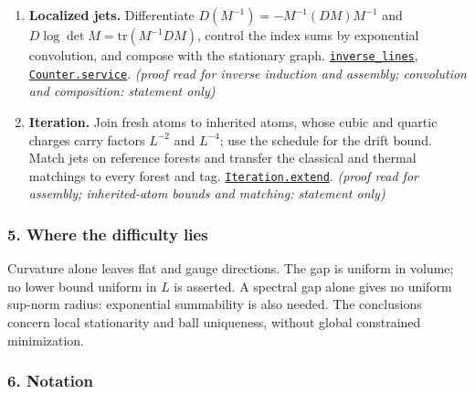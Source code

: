 \documentclass[
  letterpaper,
  11pt]{article}
\begin{document}
\begin{enumerate}
  \emph{(proof read; direct shell/action-derivative estimates: statement
  only)}
\item
  \textbf{Localized jets.} Differentiate \(D(M^{-1})=-M^{-1}(DM)M^{-1}\)
  and \(D\log\det M=\mathrm{tr}(M^{-1}DM)\), control the index sums by
  exponential convolution, and compose with the stationary graph.
  \href{https://github.com/yang-mills-group/OpenAI-YM-20261028/blob/3456e5e75cf8d4cd558955a5c7638fba2d68f464/YM/Planned/STATIONARY_JET_PORT/Lines.lean\#L56-L108}{\texttt{inverse\_lines}},
  \href{https://github.com/yang-mills-group/OpenAI-YM-20261028/blob/3456e5e75cf8d4cd558955a5c7638fba2d68f464/YM/Planned/STATIONARY_JET_PORT/InUse.lean\#L116-L145}{\texttt{Counter.service}}.
  \emph{(proof read for inverse induction and assembly; convolution and
  composition: statement only)}
\item
  \textbf{Iteration.} Join fresh atoms to inherited atoms, whose cubic
  and quartic charges carry factors \(L^{-2}\) and \(L^{-4}\); use the
  schedule for the drift bound. Match jets on reference forests and
  transfer the classical and thermal matchings to every forest and tag.
  \href{https://github.com/yang-mills-group/OpenAI-YM-20261028/blob/3456e5e75cf8d4cd558955a5c7638fba2d68f464/YM/Extra/ITERATION_NO_LOSS/Mechanism.lean\#L115-L150}{\texttt{Iteration.extend}}.
  \emph{(proof read for assembly; inherited-atom bounds and matching:
  statement only)}
\end{enumerate}

\subsubsection{5. Where the difficulty
lies}\label{where-the-difficulty-lies-8}

Curvature alone leaves flat and gauge directions. The gap is uniform in
volume; no lower bound uniform in \(L\) is asserted. A spectral gap
alone gives no uniform sup-norm radius: exponential summability is also
needed. The conclusions concern local stationarity and ball uniqueness,
without global constrained minimization.

\subsubsection{6. Notation}\label{notation-8}
\end{document}
